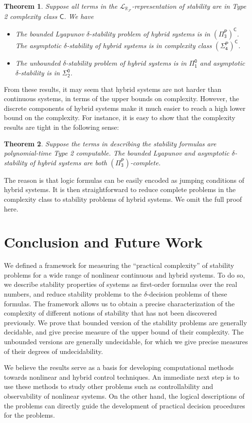 \documentclass[12pt]{article}
\theoremstyle{plain}
\newtheorem{theorem}{Theorem}[section]
\theoremstyle{definition}
\newcommand{\lrf}{\mathcal{L}_{\mathbb{R}_{\mathcal{F}}}}
\begin{document}
\begin{theorem} Suppose all terms in the $\lrf$-representation of stability are in Type 2 complexity class $\mathsf{C}$. We have
\begin{itemize}
\item The bounded Lyapunov $\delta$-stability problem of hybrid systems is in $\mathsf{(\Pi^P_3)^C}$. The asymptotic $\delta$-stability of hybrid systems is in complexity class $\mathsf{(\Sigma^P_4)^C}$.
\item The unbounded $\delta$-stability problem of hybrid systems is in $\mathsf{\Pi_1^0}$ and asymptotic $\delta$-stability is in $\mathsf{\Sigma_2^0}$.
\end{itemize}
\end{theorem}
From these results, it may seem that hybrid systems are not harder than continuous systems, in terms of the upper bounds on complexity. However, the discrete components of hybrid systems make it much easier to reach a high lower bound on the complexity. For instance, it is easy to show that the complexity results are tight in the following sense:
\begin{theorem}
Suppose the terms in describing the stability formulas are polynomial-time Type 2 computable. The bounded Lyapunov and asymptotic $\delta$-stability of hybrid systems are both $\mathsf{(\Pi^P_3)}$-complete.
\end{theorem}
The reason is that logic formulas can be easily encoded as jumping conditions of hybrid systems. It is then straightforward to reduce complete problems in the complexity class to stability problems of hybrid systems. We omit the full proof here.

\section{Conclusion and Future Work}
We defined a framework for measuring the ``practical complexity'' of stability problems for a wide range of nonlinear continuous and hybrid systems. To do so, we describe stability properties of systems as first-order formulas over the real numbers, and reduce stability problems to the $\delta$-decision problems of these formulas. The framework allows us to obtain a precise characterization of the complexity of different notions of stability that has not been discovered previously. We prove that bounded version of the stability problems are generally decidable, and give precise measure of the upper bound of their complexity. The unbounded versions are generally undecidable, for which we give precise measures of their degrees of undecidability.

We believe the results serve as a basis for developing computational methods towards nonlinear and hybrid control techniques. An immediate next step is to use these methods to study other problems such as controllability and observability of nonlinear systems. On the other hand, the logical descriptions of the problems can directly guide the development of practical decision procedures for the problems.



\end{document}
